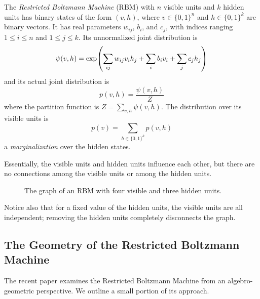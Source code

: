 \documentclass[11pt,titlepage]{article}
\numberwithin{equation}{section}
\begin{document}
    \begin{definition}
    The \emph{Restricted Boltzmann Machine} (RBM) with $n$ visible units and $k$
    hidden units has binary states of the form $(v, h)$, where $v \in \{0,1\}^n$
    and $h \in \{0,1\}^k$ are binary vectors.  It has real parameters $w_{ij}$,
    $b_i$, and $c_j$, with indices ranging $1 \le i \le n$ and $1 \le j \le k$.
    Its unnormalized joint distribution is
    \begin{equation}\label{eq:rbm-unnorm}
        \psi(v, h) = \exp\pdil*{
            \sum_{ij} w_{ij} v_i h_j + \sum_i b_i v_i + \sum_j c_j h_j
        }
    \end{equation}
    and its actual joint distribution is 
    \[
        p(v, h) = \frac{\psi(v,h)}{Z}
    \] 
    where the partition function is $Z = \sum_{v,h} \psi(v, h)$.  The
    distribution over its visible units is
    \[
        p(v) = \sum_{h \in \{0,1\}^k} p(v,h)
    \]
    a \emph{marginalization} over the hidden states.
    \end{definition}
    Essentially, the visible units and hidden units influence each other, but
    there are no connections among the visible units or among the hidden units.
    \begin{figure}[H]
        \centering
        \caption{The graph of an RBM with four visible and three hidden units.}
    \end{figure}
    \noindent Notice also that for a fixed value of the hidden units, the
    visible units are all independent; removing the hidden units completely
    disconnects the graph.
    
\subsection{The Geometry of the Restricted Boltzmann Machine}
    The recent paper \cite{CMS09} examines the Restricted Boltzmann Machine from
    an algebro-geometric perspective.  We outline a small portion of its
    approach.
    
\end{document}
